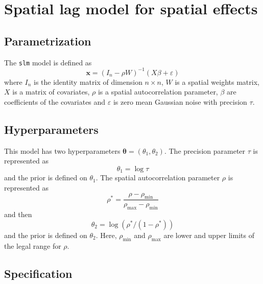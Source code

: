 \documentclass[a4paper,11pt]{article}
\begin{document}
\section*{Spatial lag model for spatial effects}

\subsection*{Parametrization}

The \texttt{slm} model is defined as
\begin{displaymath}
    \mathbf{x} = (I_n-\rho W)^{-1}(X\beta +\varepsilon)
\end{displaymath}
where $I_n$ is the identity matrix of dimension $n\times n$, $W$ is a
spatial weights matrix, $X$ is a matrix of covariates, $\rho$ is a
spatial autocorrelation parameter, $\beta$ are coefficients of the
covariates and $\varepsilon$ is zero mean Gaussian noise with precision
$\tau$.

\subsection*{Hyperparameters}

This model has two hyperparameters $\mathbf{\theta} = (\theta_{1},
\theta_{2})$. The precision parameter $\tau$ is represented as
\begin{displaymath}
    \theta_{1} =\log \tau
\end{displaymath}
and the prior is defined on $\theta_{1}$. The spatial autocorrelation
parameter $\rho$ is represented as
\begin{displaymath}
    \rho^{*} = \frac{\rho - \rho_{\text{min}}}{
        \rho_{\text{max}} - \rho_{\text{min}}}
\end{displaymath}
and then
\begin{displaymath}
    \theta_{2} = \log(\rho^{*}/(1-\rho^{*}))
\end{displaymath}
and the prior is defined on $\theta_{2}$. Here, $\rho_{\text{min}}$
and $\rho_{\text{max}}$ are lower and upper limits of the legal range
for $\rho$.

\subsection*{Specification}
\end{document}
